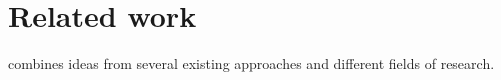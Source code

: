 

\section{Related work}\label{sec:tacle_related_work}
\sname combines ideas from several existing approaches and different fields of research.

